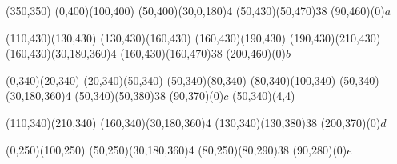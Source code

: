 \documentclass[a4paper]{article}
\begin{document}
\begin{center}
    \begin{axopicture}(350,350)
        \Line[arrow,arrowpos=0.5,arrowlength=6,arrowwidth=3,arrowinset=0.1](0,400)(100,400)
        \DashArc(50,400)(30,0,180){4}
        \Photon(50,430)(50,470){3}{8}
        \Text(90,460)(0){$a$}

        \Line[](110,430)(130,430)
        \Line[arrow,arrowpos=0.5,arrowlength=6,arrowwidth=3,arrowinset=0.1](130,430)(160,430)
         \Line[arrow,arrowpos=0.5,arrowlength=6,arrowwidth=3,arrowinset=0.1](160,430)(190,430)
        \Line[](190,430)(210,430)
        \DashArc(160,430)(30,180,360){4}
        \Photon(160,430)(160,470){3}{8}
        \Text(200,460)(0){$b$}

        \Line[](0,340)(20,340)
        \Line[arrow,arrowpos=0.5,arrowlength=6,arrowwidth=3,arrowinset=0.1](20,340)(50,340)
         \Line[arrow,arrowpos=0.5,arrowlength=6,arrowwidth=3,arrowinset=0.1](50,340)(80,340)
        \Line[](80,340)(100,340)
        \DashArc(50,340)(30,180,360){4}
        \Photon(50,340)(50,380){3}{8}
        \Text(90,370)(0){$c$}
        \BBoxc(50,340)(4,4)

        \Line[arrow,arrowpos=0.5,arrowlength=6,arrowwidth=3,arrowinset=0.1](110,340)(210,340)
        \DashArc(160,340)(30,180,360){4}
        \Photon(130,340)(130,380){3}{8}
        \Text(200,370)(0){$d$}

        \Line[arrow,arrowpos=0.5,arrowlength=6,arrowwidth=3,arrowinset=0.1](0,250)(100,250)
        \DashArc(50,250)(30,180,360){4}
        \Photon(80,250)(80,290){3}{8}
        \Text(90,280)(0){$e$}


\end{axopicture}
\end{center}
\end{document}
